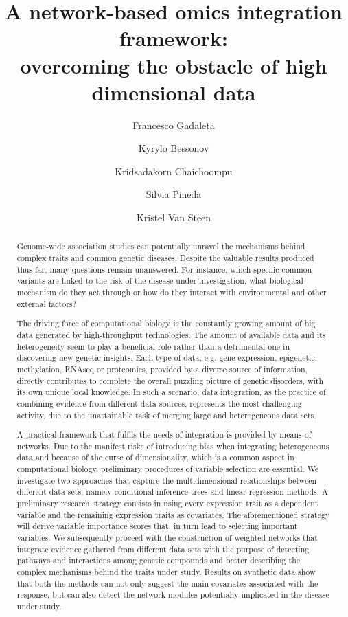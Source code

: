\documentclass[11pt, oneside]{article}   	%
\title{A network-based omics integration framework:\\
 overcoming the obstacle of high dimensional data}
\author[1,2]{Francesco Gadaleta}
\author[1,2]{Kyrylo Bessonov}
\author[1,2]{Kridsadakorn Chaichoompu}
\author[3]{Silvia Pineda}
\author[1,2]{Kristel Van Steen}
\affil[1]{Systems and Modeling Unit, Montefiore Institute, University of Liege, Belgium}
\affil[2]{Bioinformatics and Modeling, GIGA-R, University of Liege, Belgium}
\affil[3]{Centro Nacional de Investigaciones Oncologicas, Spain}
\affil[1]{\textit {\{francesco.gadaleta, kristel.vansteen\}@ulg.ac.be}}
\date{}
\begin{document}
\maketitle

\begin{abstract}
Genome-wide association studies can potentially unravel the mechanisms behind complex traits and common genetic diseases. Despite the valuable results produced thus far, many questions remain unanswered. For instance, which specific common variants are linked to the risk of
the disease under investigation, what biological mechanism do they act through or how do they interact with environmental and other external
factors? 

The driving force of computational biology is the constantly growing amount of big data generated by high-throughput technologies. The amount of available data and its heterogeneity seem to play a beneficial role rather than a detrimental one in discovering new genetic insights. Each type of data, e.g. gene expression, epigenetic, methylation, RNAseq or proteomics, provided by a diverse source of information, directly contributes to complete the overall puzzling picture of genetic disorders, with its own unique local knowledge. In such a scenario, data integration, as the practice of combining evidence from different data sources, represents the most challenging activity, due to the unattainable task of merging large and heterogeneous data sets.

A practical framework that fulfils the needs of integration is provided by means of networks. Due to the manifest risks of introducing bias when integrating heterogeneous data and because of the curse of dimensionality, which is a common aspect in computational biology, preliminary procedures of variable selection are essential. We investigate two approaches that capture the multidimensional relationships between different data sets, namely conditional inference trees and linear regression methods. A preliminary research strategy consists in using every expression trait as a dependent variable and the remaining expression traits as covariates. The aforementioned strategy will derive variable importance scores that, in turn lead to selecting important variables. We subsequently proceed with the construction of weighted networks that integrate evidence gathered from different data sets with the purpose of detecting pathways and interactions among genetic compounds and better describing the complex mechanisms behind the traits under study.
Results on synthetic data show that both the methods can not only suggest the main covariates associated with the response, but can also detect the network modules potentially implicated in the disease under study.



\end{abstract}
\end{document}
